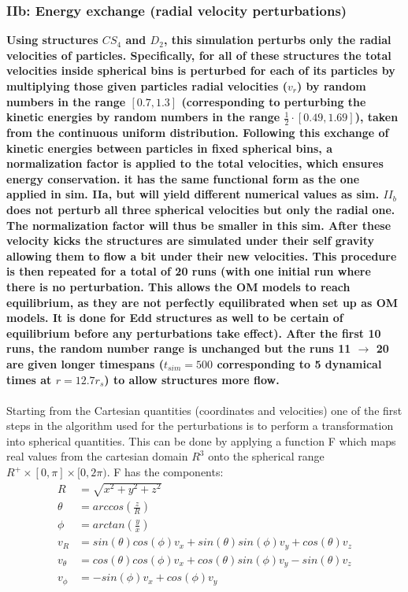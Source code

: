 \subsubsection{IIb: Energy exchange (radial velocity perturbations)}
\textbf{Using structures $CS_4$ and $D_2$, this simulation perturbs only the radial velocities of particles. Specifically, for all of these structures the total velocities inside spherical bins is perturbed for each of its particles by multiplying those given particles radial velocities ($v_r$) by random numbers in the range $[0.7, 1.3]$ (corresponding to perturbing the kinetic energies by random numbers in the range $\frac{1}{2}\cdot[0.49, 1.69]$), taken from the continuous uniform distribution. Following this exchange of kinetic energies between particles in fixed spherical bins, a normalization factor is applied to the total velocities, which ensures energy conservation. it has the same functional form as the one applied in sim. IIa, but will yield different numerical values as sim. $II_b$ does not perturb all three spherical velocities but only the radial one. The normalization factor will thus be smaller in this sim. After these velocity kicks the structures are simulated under their self gravity allowing them to flow a bit under their new velocities. This procedure is then repeated for a total of 20 runs (with one initial run where there is no perturbation. This allows the OM models to reach equilibrium, as they are not perfectly equilibrated when set up as OM models. It is done for Edd structures as well to be certain of equilibrium before any perturbations take effect). After the first 10 runs, the random number range is unchanged but the runs 11 $\rightarrow$ 20 are given longer timespans ($t_{sim} = 500$ corresponding to 5 dynamical times at $r = 12.7r_s$) to allow structures more flow.} \\ \\

Starting from the Cartesian quantities (coordinates and velocities) one of the first steps in the algorithm used for the perturbations is to perform a transformation into spherical quantities. This can be done by applying a function F which maps real values from the cartesian domain $R^3$ onto the spherical range $R^+ \times [0,\pi] \times [0,2\pi)$. F has the components: \\ 

\begin{align*}
R          & = \sqrt{x^2+y^2+z^2} \\
\theta     & = arccos(\frac{z}{R}) \\
\phi       & = arctan(\frac{y}{x}) \\
v_R        & = sin(\theta)cos(\phi)v_x+sin(\theta)sin(\phi)v_y+cos(\theta)v_z \\
v_{\theta} & = cos(\theta)cos(\phi)v_x+cos(\theta)sin(\phi)v_y-sin(\theta)v_z \\
v_{\phi}   & = - sin(\phi)v_x + cos(\phi)v_y \\
\end{align*}

